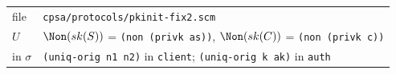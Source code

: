 \par\smallskip\noindent\begin{tabular}{@{}l p{}@{}}
file & \texttt{cpsa/protocols/pkinit-fix2.scm}\\
$U$ & $\Non(sk(S))$ = \texttt{(non (privk as))}, $\Non(sk(C))$ = \texttt{(non (privk c))}\\
in $\sigma$ & \texttt{(uniq-orig n1 n2)} in \texttt{client}; \texttt{(uniq-orig k ak)} in \texttt{auth}\\
\end{tabular}

